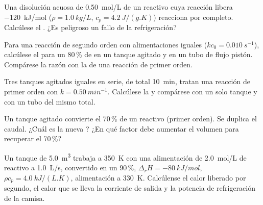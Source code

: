 \begin{exercise}[$\star$]\label{exo:b2:continuous-reactors:4}
Una disolución acuosa de \qty{0.50}{mol/L} de un reactivo cuya reacción
libera \qty{-120}{kJ/mol} ($\rho = \qty{1.0}{kg/L}$, $c_p =
\qty{4.2}{J/(g.K)}$) reacciona por completo. Calcúlese el . ¿Es peligroso un fallo de la refrigeración?
\end{exercise}

\begin{exercise}[$\star\star$]\label{exo:b2:continuous-reactors:5}
Para una reacción de segundo orden con alimentaciones iguales ($kc_0 = \qty{0.010}{s^{-1}}$),
calcúlese el  para un 80\,\% de  en un tanque agitado y en un
tubo de flujo pistón. Compárese la razón con la de una reacción de primer orden.
\end{exercise}

\begin{exercise}[$\star\star$]\label{exo:b2:continuous-reactors:6}
Tres tanques agitados iguales en serie, de  total \qty{10}{min},
tratan una reacción de primer orden con $k = \qty{0.50}{min^{-1}}$. Calcúlese la
 y compárese con un solo tanque y con un tubo del mismo 
total.
\end{exercise}

\begin{exercise}[$\star\star$]\label{exo:b2:continuous-reactors:7}
Un tanque agitado convierte el 70\,\% de un reactivo (primer orden). Se duplica el caudal.
¿Cuál es la nueva ? ¿En qué factor debe aumentar el volumen para
recuperar el 70\,\%?
\end{exercise}

\begin{exercise}[$\star\star$]\label{exo:b2:continuous-reactors:8}
Un tanque de \qty{5.0}{m^3} trabaja a \qty{350}{K} con una alimentación de
\qty{2.0}{mol/L} de reactivo a \qty{1.0}{L/s}, convertido en un 90\,\%, $\Delta_r H
= \qty{-80}{kJ/mol}$, $\rho c_p = \qty{4.0}{kJ/(L.K)}$, alimentación a \qty{330}{K}.
Calcúlense el calor liberado por segundo, el calor que se lleva la corriente de
salida y la potencia de refrigeración de la camisa.
\end{exercise}

